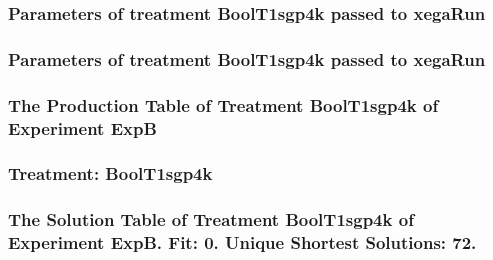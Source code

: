 \documentclass[18pt,c]{beamer}
\begin{document}

 \begin{frame}
 \fontsize{8pt}{9pt}\selectfont
 \frametitle{  Parameters of treatment BoolT1sgp4k passed to xegaRun
 }

 \label{ExpBtParmTable030.tex}  
 \end{frame}


 \begin{frame}
 \fontsize{8pt}{9pt}\selectfont
 \frametitle{  Parameters of treatment BoolT1sgp4k passed to xegaRun
 }

 \label{ExpBtParmTable031.tex}  
 \end{frame}

 \begin{frame}
 \fontsize{8pt}{9pt}\selectfont
 \frametitle{ The Production Table of Treatment BoolT1sgp4k of Experiment ExpB }

 \label{ExpBGrammarTable007.tex}  
 \end{frame}

 \begin{frame}
 \fontsize{8pt}{9pt}\selectfont
 \frametitle{ Treatment: BoolT1sgp4k }

 \label{ExpBStatsTable014.tex}  
 \end{frame}

 \begin{frame}
 \fontsize{8pt}{9pt}\selectfont
 \frametitle{ The Solution Table of Treatment BoolT1sgp4k of Experiment ExpB. Fit: 0. Unique Shortest Solutions: 72. }

 \label{ExpBSolutionTable007.tex}  
 \end{frame}
\end{document}
